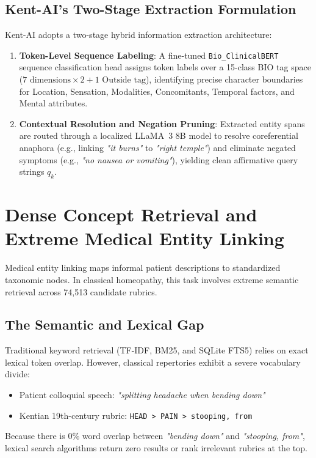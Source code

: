 \begin{sloppypar}
\subsection{Kent-AI's Two-Stage Extraction Formulation}
Kent-AI adopts a two-stage hybrid information extraction architecture:
\begin{enumerate}
    \item \textbf{Token-Level Sequence Labeling}: A fine-tuned \texttt{Bio\_ClinicalBERT} sequence classification head assigns token labels over a 15-class BIO tag space ($7 \text{ dimensions} \times 2 + 1 \text{ Outside tag}$), identifying precise character boundaries for Location, Sensation, Modalities, Concomitants, Temporal factors, and Mental attributes.
    \item \textbf{Contextual Resolution and Negation Pruning}: Extracted entity spans are routed through a localized LLaMA~3 8B model to resolve coreferential anaphora (e.g., linking \emph{"it burns"} to \emph{"right temple"}) and eliminate negated symptoms (e.g., \emph{"no nausea or vomiting"}), yielding clean affirmative query strings $q_k$.
\end{enumerate}

\section{Dense Concept Retrieval and Extreme Medical Entity Linking}
Medical entity linking maps informal patient descriptions to standardized taxonomic nodes. In classical homeopathy, this task involves extreme semantic retrieval across 74,513 candidate rubrics.

\subsection{The Semantic and Lexical Gap}
Traditional keyword retrieval (TF-IDF, BM25, and SQLite FTS5) relies on exact lexical token overlap. However, classical repertories exhibit a severe vocabulary divide:
\begin{itemize}
    \item Patient colloquial speech: \emph{"splitting headache when bending down"}
    \item Kentian 19th-century rubric: \texttt{HEAD > PAIN > stooping, from}
\end{itemize}
Because there is 0\% word overlap between \emph{"bending down"} and \emph{"stooping, from"}, lexical search algorithms return zero results or rank irrelevant rubrics at the top.


\end{sloppypar}
